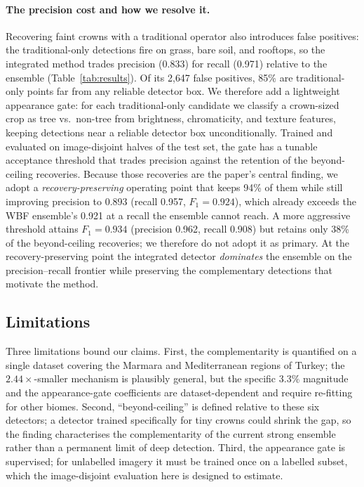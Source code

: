 \paragraph{The precision cost and how we resolve it.}
Recovering faint crowns with a traditional operator also introduces false
positives: the traditional-only detections fire on grass, bare soil, and
rooftops, so the integrated method trades precision (0.833) for recall (0.971)
relative to the ensemble (Table~\ref{tab:results}). Of its 2{,}647 false
positives, 85\% are traditional-only points far from any reliable detector box.
We therefore add a lightweight appearance gate: for each traditional-only
candidate we classify a crown-sized crop as tree vs.\ non-tree from
brightness, chromaticity, and texture features, keeping detections near a
reliable detector box unconditionally. Trained and evaluated on image-disjoint
halves of the test set, the gate has a tunable acceptance threshold that trades
precision against the retention of the beyond-ceiling recoveries. Because those
recoveries are the paper's central finding, we adopt a \emph{recovery-preserving}
operating point that keeps 94\% of them while still improving precision to 0.893
(recall 0.957, $F_1 = 0.924$), which already exceeds the WBF ensemble's 0.921 at
a recall the ensemble cannot reach. A more aggressive threshold attains
$F_1 = 0.934$ (precision 0.962, recall 0.908) but retains only 38\% of the
beyond-ceiling recoveries; we therefore do not adopt it as primary. At the
recovery-preserving point the integrated detector \emph{dominates} the ensemble
on the precision--recall frontier while preserving the complementary detections
that motivate the method.


\subsection{Limitations}
Three limitations bound our claims. First, the complementarity is quantified on
a single dataset covering the Marmara and Mediterranean regions of Turkey; the
$2.44\times$-smaller mechanism is plausibly general, but the specific 3.3\%
magnitude and the appearance-gate coefficients are dataset-dependent and require
re-fitting for other biomes. Second, ``beyond-ceiling'' is defined relative to
these six detectors; a detector trained specifically for tiny crowns could
shrink the gap, so the finding characterises the complementarity of the current
strong ensemble rather than a permanent limit of deep detection. Third, the
appearance gate is supervised; for unlabelled imagery it must be trained once on
a labelled subset, which the image-disjoint evaluation here is designed to
estimate.
